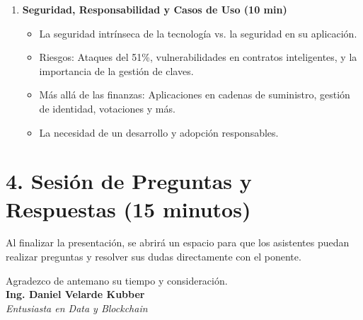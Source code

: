 \documentclass[12pt,a4paper]{article}
\begin{document}
\begin{enumerate}
    \item \textbf{Seguridad, Responsabilidad y Casos de Uso (10 min)}
    \begin{itemize}
        \item La seguridad intrínseca de la tecnología vs. la seguridad en su aplicación.
        \item Riesgos: Ataques del 51\%, vulnerabilidades en contratos inteligentes, y la importancia de la gestión de claves.
        \item Más allá de las finanzas: Aplicaciones en cadenas de suministro, gestión de identidad, votaciones y más.
        \item La necesidad de un desarrollo y adopción responsables.
    \end{itemize}
\end{enumerate}

\section*{4. Sesión de Preguntas y Respuestas (15 minutos)}

Al finalizar la presentación, se abrirá un espacio para que los asistentes puedan realizar preguntas y resolver sus dudas directamente con el ponente.

\vspace{2cm}

\begin{center}
    Agradezco de antemano su tiempo y consideración. \\
    \vspace{0.5cm}
    \textbf{Ing. Daniel Velarde Kubber} \\
    \textit{Entusiasta en Data y Blockchain}
\end{center}
\end{document}
